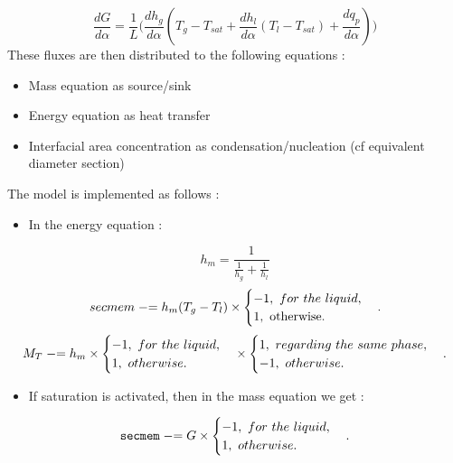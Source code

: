 \begin{equation}
   \frac{dG}{d\alpha}=\frac{1}{L}\Bigg(\frac{dh_g}{d\alpha}(T_g-T_{sat}+\frac{dh_l}{d\alpha}(T_l-T_{sat})+\frac{dq_p}{d\alpha}) \Bigg)
\end{equation}
These fluxes are then distributed to the following equations :
\begin{itemize}
    \item[\small \textcolor{blue}{\ding{109}}] Mass equation as source/sink
    \item[\small \textcolor{blue}{\ding{109}}] Energy equation as heat transfer
    \item[\small \textcolor{blue}{\ding{109}}] Interfacial area concentration as condensation/nucleation (cf equivalent diameter section)
\end{itemize}
The model is implemented as follows :\\
\begin{itemize}
    \item[\small \textcolor{blue}{\ding{109}}] In the energy equation : 
\end{itemize}
\begin{equation}
    h_m=\frac{1}{\frac{1}{h_g}+\frac{1}{h_l}}
\end{equation}
\begin{equation}
    secmem \mathrel{-}= h_m(T_g-T_l)\times \begin{cases} -1,\ for\ the\ liquid, \\ 1,\ \text{otherwise}. \end{cases}.
\end{equation}
\begin{equation}
    M_T \minuseq h_m\times \begin{cases} -1,\ for\ the\ liquid, \\ 1,\ otherwise. \end{cases}\times \begin{cases} 1,\ regarding\ the\ same\ phase, \\ -1,\ otherwise. \end{cases}.
\end{equation}
\begin{itemize}
    \item[\small \textcolor{blue}{\ding{109}}] If saturation is activated, then in the mass equation we get : 
\end{itemize}
\begin{equation}
    \texttt{secmem} \mathrel{-}= G\times \begin{cases} -1,\ for\ the\ liquid, \\ 1,\ otherwise. \end{cases}.
\end{equation}
